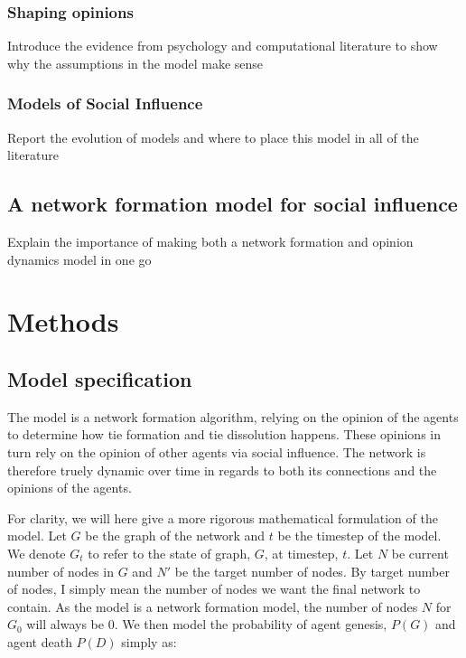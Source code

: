 \documentclass[9pt,twocolumn,twoside]{ilcss}
\begin{document}
\subsubsection{Shaping opinions}

Introduce the evidence from psychology and computational literature to show why the assumptions in the model make sense

\subsubsection{Models of Social Influence}

Report the evolution of models and where to place this model in all of the literature

\subsection{A network formation model for social influence}

Explain the importance of making both a network formation and opinion dynamics model in one go

\section{Methods}

\subsection{Model specification}

The model is a network formation algorithm, relying on the opinion of the agents to determine how tie formation and tie dissolution happens. These opinions in turn rely on the opinion of other agents via social influence. 
The network is therefore truely dynamic over time in regards to both its connections and the opinions of the agents.

For clarity, we will here give a more rigorous mathematical formulation of the model. 
Let $G$ be the graph of the network and $t$ be the timestep of the model. 
We denote $G_t$ to refer to the state of graph, $G$, at timestep, $t$. 
Let $N$ be current number of nodes in $G$ and $N'$ be the target number of nodes. By target number of nodes, I simply mean the number of nodes we want the final network to contain. 
As the model is a network formation model, the number of nodes $N$ for $G_0$ will always be 0. 
We then model the probability of agent genesis, $P(G)$ and agent death $P(D)$ simply as:
\end{document}
